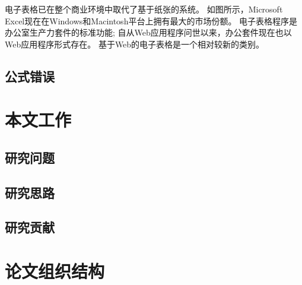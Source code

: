 电子表格已在整个商业环境中取代了基于纸张的系统。
如图所示，Microsoft Excel现在在Windows和Macintosh平台上拥有最大的市场份额。
电子表格程序是办公室生产力套件的标准功能; 自从Web应用程序问世以来，办公套件现在也以Web应用程序形式存在。
基于Web的电子表格是一个相对较新的类别。



\subsection{公式错误}


\section{本文工作}


\subsection{研究问题}


\subsection{研究思路}


\subsection{研究贡献}


\section{论文组织结构}

